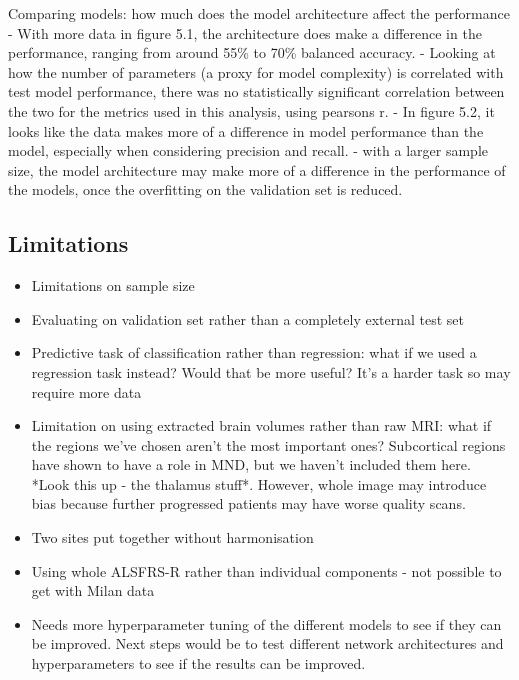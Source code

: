 Comparing models: how much does the model architecture affect the performance
- With more data in figure 5.1, the architecture does make a difference in the performance, ranging from around 55\% to 70\% balanced accuracy.
- Looking at how the number of parameters (a proxy for model complexity) is correlated with test model performance, there was no statistically significant correlation between the two for the metrics used in this analysis, using pearsons r.
- In figure 5.2, it looks like the data makes more of a difference in model performance than the model, especially when considering precision and recall.
- with a larger sample size, the model architecture may make more of a difference in the performance of the models, once the overfitting on the validation set is reduced.

\subsection{Limitations}
\begin{itemize}
    \item Limitations on sample size
    \item Evaluating on validation set rather than a completely external test set
    \item Predictive task of classification rather than regression: what if we used a regression task instead? Would that be more useful? It's a harder task so may require more data
    \item Limitation on using extracted brain volumes rather than raw MRI: what if the regions we've chosen aren't the most important ones? Subcortical regions have shown to have a role in MND, but we haven't included them here. *Look this up - the thalamus stuff*. However, whole image may introduce bias because further progressed patients may have worse quality scans.
    \item Two sites put together without harmonisation
    \item Using whole ALSFRS-R rather than individual components - not possible to get with Milan data
    \item Needs more hyperparameter tuning of the different models to see if they can be improved. Next steps would be to test different network architectures and hyperparameters to see if the results can be improved.
\end{itemize}

